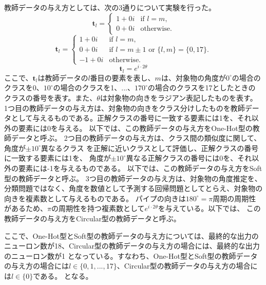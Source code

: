\documentclass[11pt,a4paper,uplatex]{ujarticle}
\begin{document}
  教師データの与え方としては、次の3通りについて実験を行った。
  \begin{equation}\label{eq:onehot}
    \mathbf{t}_l =
    \begin{cases}
        1 + 0i & \text{if } l = m, \\
        0 + 0i & \text{otherwise}.
    \end{cases}
  \end{equation}
  \begin{equation}\label{eq:soft}
    \mathbf{t}_l =
    \begin{cases}
        1 + 0i & \text{if } l = m, \\
        0 + 0i & \text{if } l = m \pm 1 \text{ or } \{l, m\} = \{0, 17\}.\\
        -1 + 0i & \text{otherwise}.
    \end{cases}
  \end{equation}
  \begin{equation}\label{eq:circular}
    \mathbf{t}_l = e^{i\cdot2\theta}
  \end{equation}
  ここで、$\mathbf{t}_l$は教師データの$l$番目の要素を表し、$m$は、対象物の角度が$0^\circ$の場合のクラスを0、$10^\circ$の場合のクラスを1、...、$170^\circ$の場合のクラスを17としたときの
  クラスの番号を表す。また、$\theta$は対象物の向きをラジアン表記したものを表す。
  1つ目の教師データの与え方は、対象物の向きをクラス分けしたものを教師データとして与えるものである。正解クラスの番号に一致する要素には1を、それ以外の要素には0を与える。
  以下では、この教師データの与え方をOne-Hot型の教師データと呼ぶ。
  2つ目の教師データの与え方は、クラス間の類似度に関して、角度が$\pm10^{\circ}$異なるクラス
  を正解に近いクラスとして評価し、正解クラスの番号に一致する要素には1を、 角度が$\pm10^{\circ}$異なる正解クラスの番号には0を、それ以外の要素には-1を与えるものである。
  以下では、この教師データの与え方をSoft型の教師データと呼ぶ。
  3つ目の教師データの与え方は、対象物の角度推定を、分類問題ではなく、角度を数値として予測する回帰問題としてとらえ、対象物の向きを複素数として与えるものである。
  パイプの向きは$180^{\circ} = \pi$周期の周期性があるため、$\pi$の周期性を持つ複素数として$e^{i\cdot2\theta}$を与えている。以下では、
  この教師データの与え方をCircular型の教師データと呼ぶ。

  ここで、One-Hot型とSoft型の教師データの与え方については、最終的な出力のニューロン数が18、Circular型の教師データの与え方の場合には、最終的な出力のニューロン数が1
  となっている。すなわち、One-Hot型とSoft型の教師データの与え方の場合には$l \in \{0,1,...,17\}$、Circular型の教師データの与え方の場合には$l \in \{0\}$である。
  となる。
\end{document}

